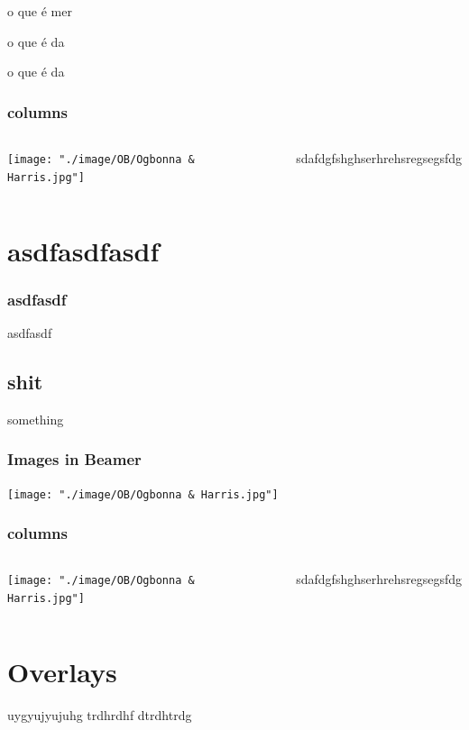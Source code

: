 \begin{frame}

\begin{block}{o que é}
mer
\end{block}
\begin{alertblock}{o que é}
da
\end{alertblock}
\begin{exampleblock}{o que é}
da
\end{exampleblock}

\end{frame}


\begin{frame}
\frametitle{columns}

\begin{columns}

\texttt{[image: "./image/OB/Ogbonna \& Harris.jpg"]}


sdafdgfshghserhrehsregsegsfdg

\end{columns}

\end{frame}



\section{asdfasdfasdf}

\begin{frame}
\frametitle{asdfasdf}

asdfasdf

\end{frame}

\subsection{shit}
something

\begin{frame}
\frametitle{Images in Beamer}

\texttt{[image: "./image/OB/Ogbonna \& Harris.jpg"]}

\end{frame}

\begin{frame}
\frametitle{columns}

\begin{columns}

\texttt{[image: "./image/OB/Ogbonna \& Harris.jpg"]}


sdafdgfshghserhrehsregsegsfdg

\end{columns}

\end{frame}
\section{Overlays}

\begin{frame}
uygyujyujuhg
trdhrdhf
dtrdhtrdg


\end{frame}



